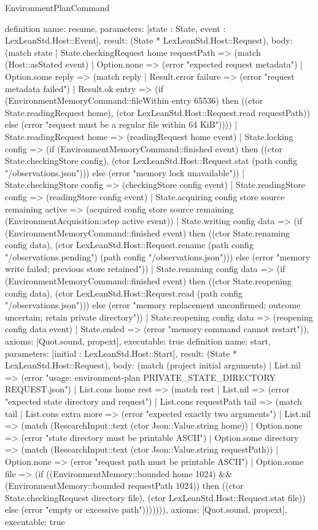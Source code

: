 \begin{lexlean}{EnvironmentPlanCommand}
\begin{semanticmodule}
{}
definition{
 name: resume, parameters: [state : State, event : LexLeanStd.Host::Event], result: (State * LexLeanStd.Host::Request),
 body: (match state | State.checkingRequest home requestPath => (match (Host::asStated event) | Option.none => (error "expected request metadata") | Option.some reply => (match reply | Result.error failure => (error "request metadata failed") | Result.ok entry => (if (EnvironmentMemoryCommand::fileWithin entry 65536) then ((ctor State.readingRequest home), (ctor LexLeanStd.Host::Request.read requestPath)) else (error "request must be a regular file within 64 KiB")))) | State.readingRequest home => (readingRequest home event) | State.locking config => (if (EnvironmentMemoryCommand::finished event) then ((ctor State.checkingStore config), (ctor LexLeanStd.Host::Request.stat (path config "/observations.json"))) else (error "memory lock unavailable")) | State.checkingStore config => (checkingStore config event) | State.readingStore config => (readingStore config event) | State.acquiring config store source remaining active => (acquired config store source remaining (EnvironmentAcquisition::step active event)) | State.writing config data => (if (EnvironmentMemoryCommand::finished event) then ((ctor State.renaming config data), (ctor LexLeanStd.Host::Request.rename (path config "/observations.pending") (path config "/observations.json"))) else (error "memory write failed; previous store retained")) | State.renaming config data => (if (EnvironmentMemoryCommand::finished event) then ((ctor State.reopening config data), (ctor LexLeanStd.Host::Request.read (path config "/observations.json"))) else (error "memory replacement unconfirmed; outcome uncertain; retain private directory")) | State.reopening config data => (reopening config data event) | State.ended => (error "memory command cannot restart")), axioms: [Quot.sound, propext], executable: true
}
definition{
 name: start, parameters: [initial : LexLeanStd.Host::Start], result: (State * LexLeanStd.Host::Request),
 body: (match (project initial arguments) | List.nil => (error "usage: environment-plan PRIVATE_STATE_DIRECTORY REQUEST.json") | List.cons home rest => (match rest | List.nil => (error "expected state directory and request") | List.cons requestPath tail => (match tail | List.cons extra more => (error "expected exactly two arguments") | List.nil => (match (ResearchInput::text (ctor Json::Value.string home)) | Option.none => (error "state directory must be printable ASCII") | Option.some directory => (match (ResearchInput::text (ctor Json::Value.string requestPath)) | Option.none => (error "request path must be printable ASCII") | Option.some file => (if ((EnvironmentMemory::bounded home 1024) && (EnvironmentMemory::bounded requestPath 1024)) then ((ctor State.checkingRequest directory file), (ctor LexLeanStd.Host::Request.stat file)) else (error "empty or excessive path"))))))), axioms: [Quot.sound, propext], executable: true
}
\end{semanticmodule}
\end{lexlean}
